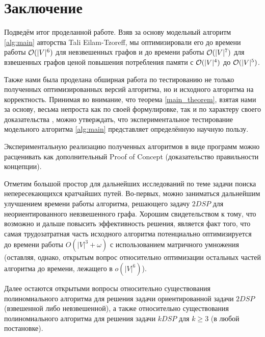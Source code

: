 \chapter{Заключение}

Подведём итог проделанной работе. Взяв за основу модельный алгоритм \ref{alg:main} авторства Tali Eilam-Tzoreff, мы оптимизировали его до времени работы $\mathcal{O}(|V|^6)$ для невзвешенных графов и до времени работы $\mathcal{O}(|V|^7)$ для взвешенных графов ценой повышения потребления памяти с $\mathcal{O}(|V|^4)$ до $\mathcal{O}(|V|^5)$. 

Также нами была проделана обширная работа по тестированию не только полученных оптимизированных версий алгоритма, но и исходного алгоритма на корректность. Принимая во внимание, что теорема \ref{main_theorem}, взятая нами за основу, весьма непроста как по своей формулировке, так и по характеру своего доказательства \cite{ET}, можно утверждать, что экспериментальное тестирование модельного алгоритма \ref{alg:main} представляет определённую научную пользу. 

Экспериментальную реализацию полученных алгоритмов в виде программ можно расценивать как дополнительный Proof of Concept (доказательство правильности концепции).

Отметим большой простор для дальнейших исследований по теме задачи поиска непересекающихся кратчайших путей. Во-первых, можно заниматься дальнейшим улучшением времени работы алгоритма, решающего задачу $2DSP$ для неориентированного невзвешенного графа. Хорошим свидетельством к тому, что возможно и дальше повысить эффективность решения, является факт того, что самая трудозатратная часть исходного алгоритма потенциально оптимизируется до времени работы $O(|V|^3 + \omega)$ с использованием матричного умножения (оставляя, однако, открытым вопрос относительно оптимизации остальных частей алгоритма до времени, лежащего в $o(|V|^6)$).

Далее остаются открытыми вопросы относительно существования полиномиального алгоритма для решения задачи ориентированной задачи $2DSP$ (взвешенной либо невзвешенной), а также относительно существования полиномиального алгоритма для решения задачи $kDSP$ для $k \geq 3$ (в любой постановке).


